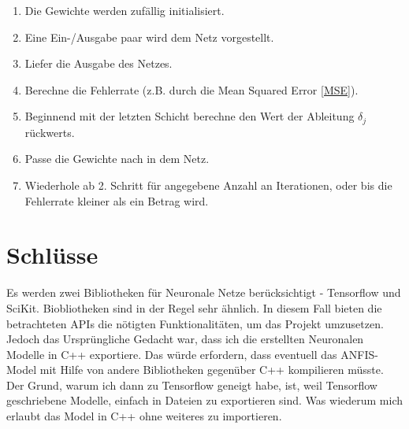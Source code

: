 \begin{enumerate}\label{BPA}
	\item Die Gewichte werden zufällig initialisiert.
	\item Eine Ein-/Ausgabe paar wird dem Netz vorgestellt.
	\item Liefer die Ausgabe des Netzes.
	\item Berechne die Fehlerrate (z.B. durch die Mean Squared Error \ref{MSE}).
	\item Beginnend mit der letzten Schicht berechne den Wert der Ableitung $\delta_j$ rückwerts.
	\item Passe die Gewichte nach in dem Netz.
	\item Wiederhole ab 2. Schritt für angegebene Anzahl an Iterationen, oder bis die Fehlerrate kleiner als ein Betrag wird.
\end{enumerate}


\section{Schlüsse}

Es werden zwei Bibliotheken für Neuronale Netze berücksichtigt - Tensorflow und SciKit. Biobliotheken sind in der Regel sehr ähnlich. In diesem Fall bieten die betrachteten APIs die nötigten Funktionalitäten, um das Projekt umzusetzen. Jedoch das Ursprüngliche Gedacht war, dass ich die erstellten Neuronalen Modelle in C++ exportiere. Das würde erfordern, dass eventuell das ANFIS-Model mit Hilfe von andere Bibliotheken gegenüber C++ kompilieren müsste. Der Grund, warum ich dann zu Tensorflow geneigt habe, ist, weil Tensorflow geschriebene Modelle, einfach in Dateien zu exportieren sind. Was wiederum mich erlaubt das Model in C++ ohne weiteres zu importieren.
